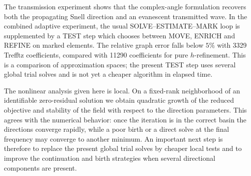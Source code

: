 \documentclass[pdflatex,sn-mathphys-num]{sn-jnl}
\theoremstyle{thmstyleone}
\theoremstyle{thmstyletwo}
\begin{document}
The transmission experiment shows that the complex-angle formulation recovers both the propagating Snell direction and an evanescent transmitted wave.  In the combined adaptive experiment, the usual SOLVE--ESTIMATE--MARK loop is supplemented by a TEST step which chooses between MOVE, ENRICH and REFINE on marked elements.  The relative graph error falls below $5\%$ with 3329 Trefftz coefficients, compared with 11290 coefficients for pure $h$-refinement.  This is a comparison of approximation spaces; the present TEST step uses several global trial solves and is not yet a cheaper algorithm in elapsed time.

The nonlinear analysis given here is local.  On a fixed-rank neighborhood of an identifiable zero-residual solution we obtain quadratic growth of the reduced objective and stability of the field with respect to the direction parameters.  This agrees with the numerical behavior: once the iteration is in the correct basin the directions converge rapidly, while a poor birth or a direct solve at the final frequency may converge to another minimum.  An important next step is therefore to replace the present global trial solves by cheaper local tests and to improve the continuation and birth strategies when several directional components are present.
\end{document}
